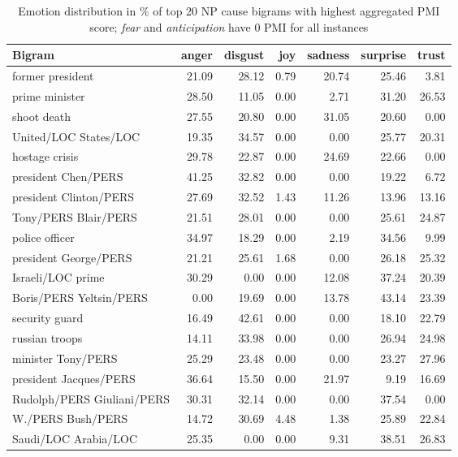 \begin{table}[h]
\centering
\begin{tabular}{l|r|r|r|r|r|r}
{\bf Bigram} & {\bf anger} & {\bf disgust} & {\bf joy} & {\bf sadness} & {\bf surprise} & {\bf trust} \\\hline
former president & 21.09 & 28.12 & 0.79 & 20.74 & 25.46 & 3.81 \\
prime minister & 28.50 & 11.05 & 0.00 & 2.71 & 31.20 & 26.53 \\
shoot death & 27.55 & 20.80 & 0.00 & 31.05 & 20.60 & 0.00 \\
United/LOC States/LOC & 19.35 & 34.57 & 0.00 & 0.00 & 25.77 & 20.31 \\
hostage crisis & 29.78 & 22.87 & 0.00 & 24.69 & 22.66 & 0.00 \\
president Chen/PERS & 41.25 & 32.82 & 0.00 & 0.00 & 19.22 & 6.72 \\
president Clinton/PERS & 27.69 & 32.52 & 1.43 & 11.26 & 13.96 & 13.16 \\
Tony/PERS Blair/PERS & 21.51 & 28.01 & 0.00 & 0.00 & 25.61 & 24.87 \\
police officer & 34.97 & 18.29 & 0.00 & 2.19 & 34.56 & 9.99 \\
president George/PERS & 21.21 & 25.61 & 1.68 & 0.00 & 26.18 & 25.32 \\
Israeli/LOC prime & 30.29 & 0.00 & 0.00 & 12.08 & 37.24 & 20.39 \\
Boris/PERS Yeltsin/PERS & 0.00 & 19.69 & 0.00 & 13.78 & 43.14 & 23.39 \\
security guard & 16.49 & 42.61 & 0.00 & 0.00 & 18.10 & 22.79 \\
russian troops & 14.11 & 33.98 & 0.00 & 0.00 & 26.94 & 24.98 \\
minister Tony/PERS & 25.29 & 23.48 & 0.00 & 0.00 & 23.27 & 27.96 \\
president Jacques/PERS & 36.64 & 15.50 & 0.00 & 21.97 & 9.19 & 16.69 \\
Rudolph/PERS Giuliani/PERS & 30.31 & 32.14 & 0.00 & 0.00 & 37.54 & 0.00 \\
W./PERS Bush/PERS & 14.72 & 30.69 & 4.48 & 1.38 & 25.89 & 22.84 \\
Saudi/LOC Arabia/LOC & 25.35 & 0.00 & 0.00 & 9.31 & 38.51 & 26.83
\end{tabular}
\caption{Emotion distribution in \% of top 20 NP cause bigrams with highest aggregated PMI score; \textit{fear} and \textit{anticipation} have 0 PMI for all instances}
\label{tab:percent-bigrams-overlap-pmi}
\end{table}

